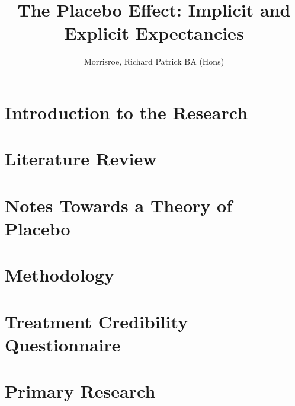 \documentclass[apsych, phd]{uccthesis}
\title{The Placebo Effect: Implicit and Explicit Expectancies}
\author{Morrisroe, Richard Patrick BA (Hons)}
\begin{document}
\maketitle



\tableofcontents

\chapter{Introduction to the Research}
\label{cha:intr-rese}


\chapter{Literature Review}
\label{cha:literature-review}


\chapter{Notes Towards a Theory of Placebo}
\label{cha:notes-towards-theory}


\chapter{Methodology}
\label{cha:methodology}
% 

% 
\chapter{Treatment Credibility Questionnaire}
\label{cha:tcqthesis}

\chapter{Primary Research}
\label{cha:primary-research}
\label{cha:primary-research-1}





\end{document}
